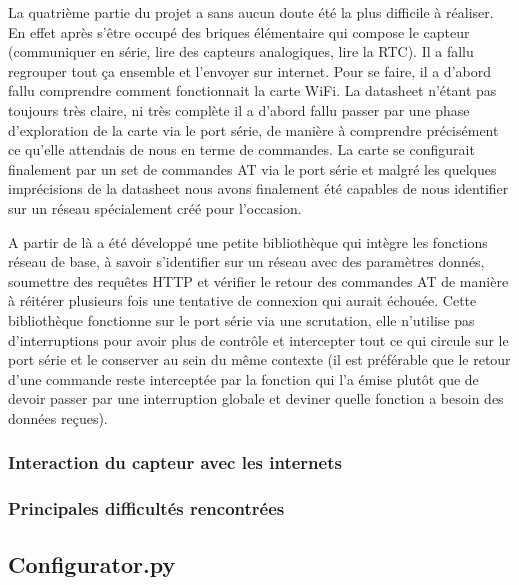 		\par
		La quatrième partie du projet a sans aucun doute été la plus difficile à réaliser. En
		effet après s'être occupé des briques élémentaire qui compose le capteur (communiquer
		en série, lire des capteurs analogiques, lire la RTC). Il a fallu regrouper tout ça
		ensemble et l'envoyer sur internet. Pour se faire, il a d'abord fallu comprendre comment
		fonctionnait la carte WiFi. La datasheet n'étant pas toujours très claire, ni très complète
		il a d'abord fallu passer par une phase \og{} d'exploration \fg{} de la carte via le port
		série, de manière à comprendre précisément ce qu'elle attendais de nous en terme de commandes.
		La carte se configurait finalement par un set de commandes AT via le port série et malgré
		les quelques imprécisions de la datasheet nous avons finalement été capables de nous identifier
		sur un réseau spécialement créé pour l'occasion.
		
		\par
		A partir de là a été développé une petite bibliothèque qui intègre les fonctions réseau de base,
		à savoir s'identifier sur un réseau avec des paramètres donnés, soumettre des requêtes HTTP et
		vérifier le retour des commandes AT de manière à réitérer plusieurs fois une tentative de connexion
		qui aurait échouée. Cette bibliothèque fonctionne sur le port série via une scrutation, elle n'utilise
		pas d'interruptions pour avoir plus de contrôle et intercepter tout ce qui circule sur le port série
		et le conserver au sein du même contexte (il est préférable que le retour d'une commande reste interceptée
		par la fonction qui l'a émise plutôt que de devoir passer par une interruption globale et deviner
		quelle fonction a besoin des données reçues).
		
		\subsubsection{Interaction du capteur avec les internets}
		
		\subsubsection{Principales difficultés rencontrées}
		
	\subsection{Configurator.py}
